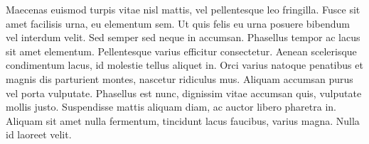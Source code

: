 Maecenas euismod turpis vitae nisl mattis, vel pellentesque leo fringilla. Fusce sit amet facilisis urna, eu elementum sem. Ut quis felis eu urna posuere bibendum vel interdum velit. Sed semper sed neque in accumsan. Phasellus tempor ac lacus sit amet elementum. Pellentesque varius efficitur consectetur. Aenean scelerisque condimentum lacus, id molestie tellus aliquet in. Orci varius natoque penatibus et magnis dis parturient montes, nascetur ridiculus mus. Aliquam accumsan purus vel porta vulputate. Phasellus est nunc, dignissim vitae accumsan quis, vulputate mollis justo. Suspendisse mattis aliquam diam, ac auctor libero pharetra in. Aliquam sit amet nulla fermentum, tincidunt lacus faucibus, varius magna. Nulla id laoreet velit.
